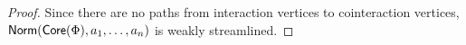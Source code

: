 \documentclass[a4paper]{amsart}
\theoremstyle{remark}
\theoremstyle{definition}
\begin{document}
\begin{proof}
Since there are no paths from interaction vertices to cointeraction vertices, $\mathsf{Norm}(\mathsf{Core}(\Phi),a_1,\dots,a_n)$ is weakly streamlined.
\end{proof}



%
% 
% 
\end{document}
